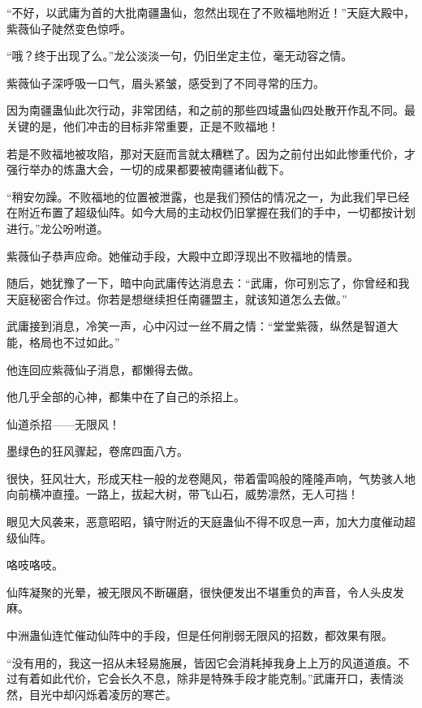
\begin{this_body}



“不好，以武庸为首的大批南疆蛊仙，忽然出现在了不败福地附近！”天庭大殿中，紫薇仙子陡然变色惊呼。

“哦？终于出现了么。”龙公淡淡一句，仍旧坐定主位，毫无动容之情。

紫薇仙子深呼吸一口气，眉头紧皱，感受到了不同寻常的压力。

因为南疆蛊仙此次行动，非常团结，和之前的那些四域蛊仙四处散开作乱不同。最关键的是，他们冲击的目标非常重要，正是不败福地！

若是不败福地被攻陷，那对天庭而言就太糟糕了。因为之前付出如此惨重代价，才强行举办的炼蛊大会，一切的成果都要被南疆诸仙截下。

“稍安勿躁。不败福地的位置被泄露，也是我们预估的情况之一，为此我们早已经在附近布置了超级仙阵。如今大局的主动权仍旧掌握在我们的手中，一切都按计划进行。”龙公吩咐道。

紫薇仙子恭声应命。她催动手段，大殿中立即浮现出不败福地的情景。

随后，她犹豫了一下，暗中向武庸传达消息去：“武庸，你可别忘了，你曾经和我天庭秘密合作过。你若是想继续担任南疆盟主，就该知道怎么去做。”

武庸接到消息，冷笑一声，心中闪过一丝不屑之情：“堂堂紫薇，纵然是智道大能，格局也不过如此。”

他连回应紫薇仙子消息，都懒得去做。

他几乎全部的心神，都集中在了自己的杀招上。

仙道杀招——无限风！

墨绿色的狂风骤起，卷席四面八方。

很快，狂风壮大，形成天柱一般的龙卷飓风，带着雷鸣般的隆隆声响，气势骇人地向前横冲直撞。一路上，拔起大树，带飞山石，威势凛然，无人可挡！

眼见大风袭来，恶意昭昭，镇守附近的天庭蛊仙不得不叹息一声，加大力度催动超级仙阵。

咯吱咯吱。

仙阵凝聚的光晕，被无限风不断碾磨，很快便发出不堪重负的声音，令人头皮发麻。

中洲蛊仙连忙催动仙阵中的手段，但是任何削弱无限风的招数，都效果有限。

“没有用的，我这一招从未轻易施展，皆因它会消耗掉我身上上万的风道道痕。不过有着如此代价，它会长久不息，除非是特殊手段才能克制。”武庸开口，表情淡然，目光中却闪烁着凌厉的寒芒。


\end{this_body}
